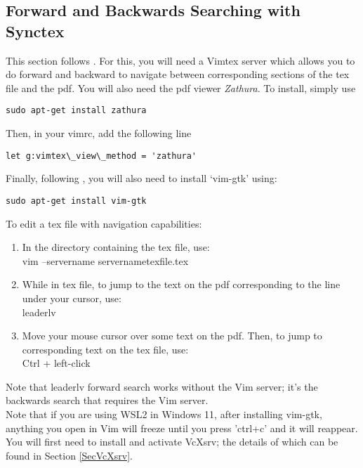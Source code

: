 \subsection{Forward and Backwards Searching with Synctex}
\label{SecFwdBckwdSynctex}
This section follows \cite{gunther2014vimtex}. For this, you will need a Vimtex
server which allows you to do forward and backward to navigate between
corresponding sections of the tex file and the pdf. You will also need the pdf
viewer \textit{Zathura}. To install, simply use
\begin{lstlisting}
sudo apt-get install zathura
\end{lstlisting}
Then, in your vimrc, add the following line
\begin{lstlisting}
let g:vimtex\_view\_method = 'zathura'
\end{lstlisting}
Finally, following \cite{lerner2004enable}, you will also need to install
`vim-gtk' using:
\begin{lstlisting}
sudo apt-get install vim-gtk
\end{lstlisting}
To edit a tex file with navigation capabilities:
\begin{enumerate}
    \item In the directory containing the tex file, use:\\
        vim --servername \tlangle servername\trangle \tlangle texfile\trangle.tex
    \item While in tex file, to jump to the text on the pdf corresponding to the
        line under your cursor, use:\\
        \tlangle leader\trangle lv
    \item Move your mouse cursor over some text on the pdf. Then, to jump to
        corresponding text on the tex file, use:\\
        Ctrl + left-click
\end{enumerate}
Note that \tlangle leader\trangle lv forward search works without the Vim
server; it's the backwards search that requires the Vim server.\\

Note that if you are using WSL2 in Windows 11, after installing vim-gtk,
anything you open in Vim will freeze until you press 'ctrl+c' and it will
reappear. You will first need to install and activate VcXsrv; the details of
which can be found in Section \ref{SecVcXsrv}.

